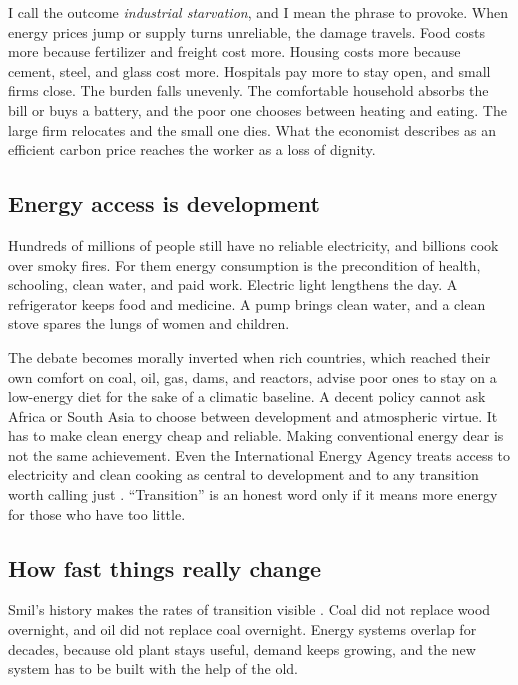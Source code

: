 \documentclass[12pt,a4paper]{book}
\begin{document}
I call the outcome \emph{industrial starvation}, and I mean the phrase to provoke. When energy prices jump or supply turns unreliable, the damage travels. Food costs more because fertilizer and freight cost more. Housing costs more because cement, steel, and glass cost more. Hospitals pay more to stay open, and small firms close. The burden falls unevenly. The comfortable household absorbs the bill or buys a battery, and the poor one chooses between heating and eating. The large firm relocates and the small one dies. What the economist describes as an efficient carbon price reaches the worker as a loss of dignity.

\subsection{Energy access is development}

Hundreds of millions of people still have no reliable electricity, and billions cook over smoky fires. For them energy consumption is the precondition of health, schooling, clean water, and paid work. Electric light lengthens the day. A refrigerator keeps food and medicine. A pump brings clean water, and a clean stove spares the lungs of women and children.

The debate becomes morally inverted when rich countries, which reached their own comfort on coal, oil, gas, dams, and reactors, advise poor ones to stay on a low-energy diet for the sake of a climatic baseline. A decent policy cannot ask Africa or South Asia to choose between development and atmospheric virtue. It has to make clean energy cheap and reliable. Making conventional energy dear is not the same achievement. Even the International Energy Agency treats access to electricity and clean cooking as central to development and to any transition worth calling just \cite{IEA2024Africa,IEAAccessAffordability}. ``Transition'' is an honest word only if it means more energy for those who have too little.

\subsection{How fast things really change}

Smil's history makes the rates of transition visible \cite{Smil2021}. Coal did not replace wood overnight, and oil did not replace coal overnight. Energy systems overlap for decades, because old plant stays useful, demand keeps growing, and the new system has to be built with the help of the old.
\end{document}

